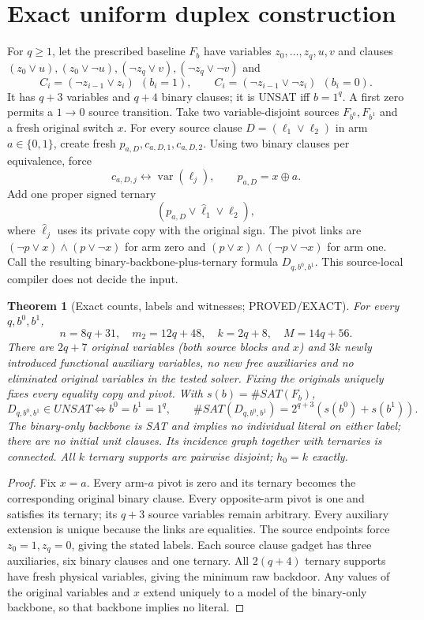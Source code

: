 \documentclass[11pt]{article}
\newtheorem{theorem}{Theorem}
\begin{document}
\section{Exact uniform duplex construction}
For $q\ge1$, let the prescribed baseline $F_b$ have variables
$z_0,\ldots,z_q,u,v$ and clauses
$(z_0\vee u),(z_0\vee\neg u),
(\neg z_q\vee v),(\neg z_q\vee\neg v)$ and
\[
C_i=(\neg z_{i-1}\vee z_i)\ \ (b_i=1),\qquad
C_i=(\neg z_{i-1}\vee\neg z_i)\ \ (b_i=0).
\]
It has $q+3$ variables and $q+4$ binary clauses; it is UNSAT iff
$b=1^q$. A first zero permits a $1\to0$ source transition.
Take two variable-disjoint sources $F_{b^0},F_{b^1}$ and a fresh
original switch $x$. For every source clause
$D=(\ell_1\vee\ell_2)$ in arm $a\in\{0,1\}$, create fresh
$p_{a,D},c_{a,D,1},c_{a,D,2}$. Using two binary clauses per
equivalence, force
\[
c_{a,D,j}\leftrightarrow\operatorname{var}(\ell_j),
\qquad p_{a,D}=x\oplus a.
\]
Add one proper signed ternary
\[
(p_{a,D}\vee\widehat\ell_1\vee\widehat\ell_2),
\]
where $\widehat\ell_j$ uses its private copy with the original sign.
The pivot links are $(\neg p\vee x)\land(p\vee\neg x)$ for arm zero
and $(p\vee x)\land(\neg p\vee\neg x)$ for arm one.
Call the resulting binary-backbone-plus-ternary formula
$D_{q,b^0,b^1}$. This source-local compiler does not decide the input.

\begin{theorem}[Exact counts, labels and witnesses; PROVED/EXACT]
For every $q,b^0,b^1$,
\[
n=8q+31,\quad m_2=12q+48,\quad k=2q+8,\quad M=14q+56.
\]
There are $2q+7$ original variables (both source blocks and $x$)
and $3k$ newly introduced functional auxiliary variables, no new free
auxiliaries and no eliminated original variables in the tested solver.
Fixing the originals uniquely fixes every equality copy and pivot.
With $s(b)=\#SAT(F_b)$,
\[
D_{q,b^0,b^1}\in UNSAT\iff b^0=b^1=1^q,\qquad
\#SAT(D_{q,b^0,b^1})=2^{q+3}(s(b^0)+s(b^1)).
\]
The binary-only backbone is SAT and implies no individual literal on
either label; there are no initial unit clauses. Its incidence graph
together with ternaries is connected. All $k$ ternary supports are
pairwise disjoint; $h_0=k$ exactly.
\end{theorem}
\begin{proof}
Fix $x=a$. Every arm-$a$ pivot is zero and its ternary becomes the
corresponding original binary clause. Every opposite-arm pivot is one
and satisfies its ternary; its $q+3$ source variables remain arbitrary.
Every auxiliary extension is unique because the links are equalities.
The source endpoints force $z_0=1,z_q=0$, giving the stated labels.
Each source clause gadget has three auxiliaries, six binary clauses
and one ternary. All $2(q+4)$ ternary supports have fresh physical
variables, giving the minimum raw backdoor. Any values of the original
variables and $x$ extend uniquely to a model of the binary-only
backbone, so that backbone implies no literal.
\end{proof}
\end{document}
